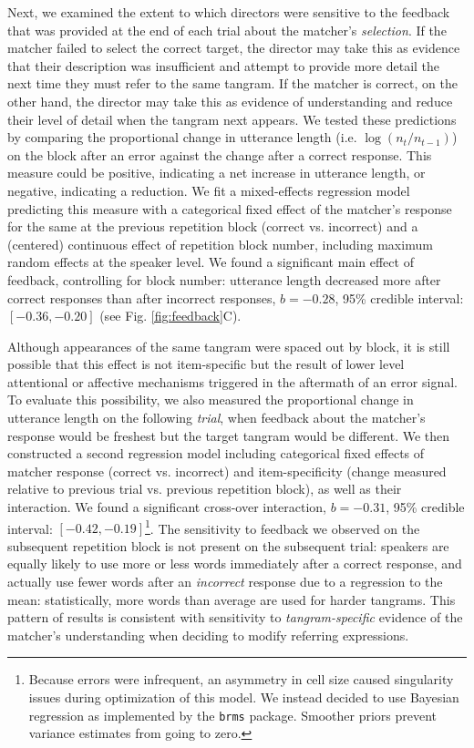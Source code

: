 \documentclass[alpha-refs]{wiley-article}
\begin{document}
Next, we examined the extent to which directors were sensitive to the feedback that was provided at the end of each trial about the matcher's \emph{selection}.
If the matcher failed to select the correct target, the director may take this as evidence that their description was insufficient and attempt to provide more detail the next time they must refer to the same tangram. 
If the matcher is correct, on the other hand, the director may take this as evidence of understanding and reduce their level of detail when the tangram next appears.
We tested these predictions by comparing the proportional change in utterance length (i.e. $\log(n_{t}/n_{t-1})$) on the block after an error against the change after a correct response.
This measure could be positive, indicating a net increase in utterance length, or negative, indicating a reduction.
We fit a mixed-effects regression model predicting this measure with a categorical fixed effect of the matcher's response for the same at the previous repetition block (correct vs. incorrect) and a (centered) continuous effect of repetition block number, including maximum random effects at the speaker level. 
We found a significant main effect of feedback, controlling for block number: utterance length decreased more after correct responses than after incorrect responses, $b = -0.28$, 95\% credible interval: $[-0.36, -0.20]$ (see Fig. \ref{fig:feedback}C).

Although appearances of the same tangram were spaced out by block, it is still possible that this effect is not item-specific but the result of lower level attentional or affective mechanisms triggered in the aftermath of an error signal. 
To evaluate this possibility, we also measured the proportional change in utterance length on the following \emph{trial}, when feedback about the matcher's response would be freshest but the target tangram would be different.
We then constructed a second regression model including categorical fixed effects of matcher response (correct vs. incorrect) and item-specificity (change measured relative to previous trial vs. previous repetition block), as well as their interaction. 
We found a significant cross-over interaction, $b = -0.31$, 95\% credible interval: $[-0.42, -0.19]$\footnote{Because errors were infrequent, an asymmetry in cell size caused singularity issues during optimization of this model. We instead decided to use Bayesian regression as implemented by the \texttt{brms} package. Smoother priors prevent variance estimates from going to zero.}.
The sensitivity to feedback we observed on the subsequent repetition block is not present on the subsequent trial: speakers are equally likely to use more or less words immediately after a correct response, and actually use fewer words after an \emph{incorrect} response due to a regression to the mean: statistically, more words than average are used for harder tangrams. 
This pattern of results is consistent with sensitivity to \emph{tangram-specific} evidence of the matcher's understanding when deciding to modify referring expressions.
\end{document}

